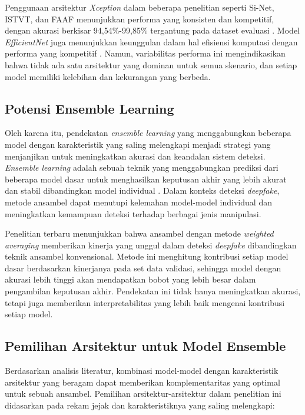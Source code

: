 Penggunaan arsitektur \textit{Xception} dalam beberapa penelitian seperti Si-Net, ISTVT, dan FAAF menunjukkan performa yang konsisten dan kompetitif, dengan akurasi berkisar 94,54\%-99,85\% tergantung pada dataset evaluasi \cite{wang2023si,zhao2023,tian2023}. Model \textit{EfficientNet} juga menunjukkan keunggulan dalam hal efisiensi komputasi dengan performa yang kompetitif \cite{ke2023}. Namun, variabilitas performa ini mengindikasikan bahwa tidak ada satu arsitektur yang dominan untuk semua skenario, dan setiap model memiliki kelebihan dan kekurangan yang berbeda.

\subsection{Potensi Ensemble Learning}

Oleh karena itu, pendekatan \textit{ensemble learning} yang menggabungkan beberapa model dengan karakteristik yang saling melengkapi menjadi strategi yang menjanjikan untuk meningkatkan akurasi dan keandalan sistem deteksi. \textit{Ensemble learning} adalah sebuah teknik yang menggabungkan prediksi dari beberapa model dasar untuk menghasilkan keputusan akhir yang lebih akurat dan stabil dibandingkan model individual \cite{dietterich2000ensemble}. Dalam konteks deteksi \textit{deepfake}, metode ansambel dapat menutupi kelemahan model-model individual dan meningkatkan kemampuan deteksi terhadap berbagai jenis manipulasi.

Penelitian terbaru menunjukkan bahwa ansambel dengan metode \textit{weighted averaging} memberikan kinerja yang unggul dalam deteksi \textit{deepfake} dibandingkan teknik ansambel konvensional. Metode ini menghitung kontribusi setiap model dasar berdasarkan kinerjanya pada set data validasi, sehingga model dengan akurasi lebih tinggi akan mendapatkan bobot yang lebih besar dalam pengambilan keputusan akhir. Pendekatan ini tidak hanya meningkatkan akurasi, tetapi juga memberikan interpretabilitas yang lebih baik mengenai kontribusi setiap model.

\subsection{Pemilihan Arsitektur untuk Model Ensemble}

Berdasarkan analisis literatur, kombinasi model-model dengan karakteristik arsitektur yang beragam dapat memberikan komplementaritas yang optimal untuk sebuah ansambel. Pemilihan arsitektur-arsitektur dalam penelitian ini didasarkan pada rekam jejak dan karakteristiknya yang saling melengkapi:

